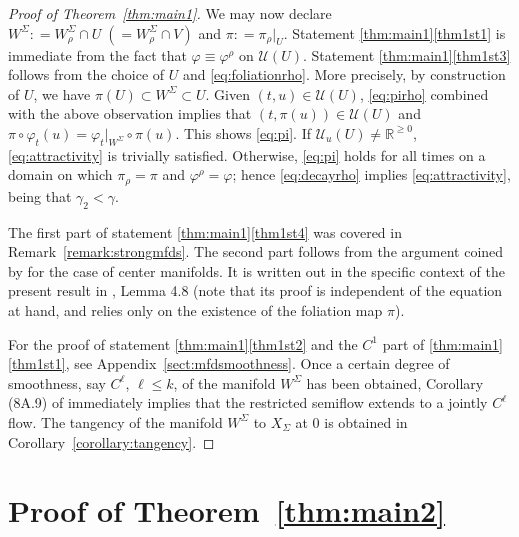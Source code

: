 \documentclass[a4paper, 12pt, oneside, reqno, notitlepage]{amsart}
\theoremstyle{plain}
\theoremstyle{definition}
\theoremstyle{remark}
\begin{document}
\begin{proof}[Proof of Theorem~\ref{thm:main1}]
We may now declare $W^\Sigma : = W^\Sigma_\rho \cap U \;  (= W^\Sigma_\rho \cap V)$ and $\pi : = \pi_\rho \vert_U$. 
Statement \ref{thm:main1}\ref{thm1st1} is immediate from the fact that $\varphi \equiv \varphi^\rho$ on $\mathcal{U}(U)$.
Statement \ref{thm:main1}\ref{thm1st3} follows from the choice of $U$ and \eqref{eq:foliationrho}.
More precisely, 
by construction of $U$, we have $\pi(U) \subset W^\Sigma \subset  U$.
Given $(t,u) \in \mathcal{U}(U)$, \eqref{eq:pirho} combined with the above observation implies that $(t,\pi(u)) \in \mathcal{U}(U)$ and $\pi \circ \varphi_t(u) = \varphi_t|_{W^\Sigma} \circ \pi(u)  $.
This shows \eqref{eq:pi}.
If $\mathcal{U}_u(U) \neq \mathbb{R}^{\geq 0}$,  \eqref{eq:attractivity} is trivially satisfied.
Otherwise, \eqref{eq:pi} holds for all times on a domain on which $\pi_\rho = \pi$ and $\varphi^\rho = \varphi$;
hence \eqref{eq:decayrho} implies \eqref{eq:attractivity}, being that $\gamma_2 < \gamma$.

The first part of statement \ref{thm:main1}\ref{thm1st4} was covered in Remark~\ref{remark:strongmfds}.
The second part follows from the argument coined by \cite{burchard1992smooth} for the case of center manifolds.
It is written out in the specific context of the present result in \cite{buza2024spectral}, Lemma 4.8 (note that its proof is independent of the equation at hand, and relies only on the existence of the foliation map $\pi$).

For the proof of statement \ref{thm:main1}\ref{thm1st2} and the $C^1$ part of \ref{thm:main1}\ref{thm1st1}, see Appendix~\ref{sect:mfdsmoothness}.
Once a certain degree of smoothness, say $C^\ell$, $\ell \leq k$, of the manifold $W^\Sigma$ has been obtained, Corollary (8A.9) of \cite{marsden1976hopf} immediately implies that the restricted semiflow extends to a jointly $C^\ell$ flow.
The tangency of the manifold $W^\Sigma$ to $X_\Sigma$ at $0$ is obtained in Corollary~\ref{corollary:tangency}.
\end{proof}


\section{Proof of Theorem~\ref{thm:main2}}
\label{sect:proofmain2}
\end{document}

